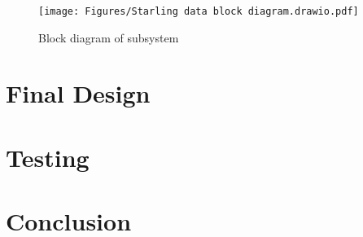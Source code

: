 \documentclass[class=report,11pt,crop=false]{standalone}
\begin{document}
		\begin{figure}[h]
			\centering
			\texttt{[image: Figures/Starling data block diagram.drawio.pdf]}
			\caption{Block diagram of subsystem}
		\end{figure}
	
	\section{Final Design}
	
	\section{Testing}
	
	\section{Conclusion}
	
	\ifstandalone
	
	\printnoidxglossary[type=\acronymtype,nonumberlist]
	\fi
\end{document}

